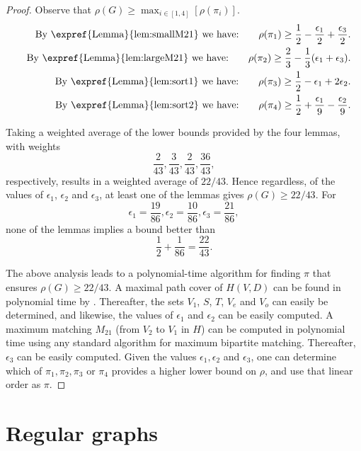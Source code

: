\begin{proof}
	Observe that $\rho(G) \ge \max_{i \in [1,4]}[\rho(\pi_i)]$.
	\begin{eqnarray}
		& & \mbox{By \expref{Lemma}{lem:smallM21} we have:} \quad \quad
		\rho(\pi_1) \ge \frac{1}{2} - \frac{\epsilon_1}{2}  + \frac{\epsilon_3}{2}.\\
		& & \mbox{By \expref{Lemma}{lem:largeM21} we have:} \quad \quad
		\rho(\pi_2) \ge \frac{2}{3} - \frac{1}{3}(\epsilon_1 + \epsilon_3).\\
		& & \mbox{By \expref{Lemma}{lem:sort1} we have:} \quad \quad
		\rho(\pi_3) \ge \frac{1}{2} - \epsilon_1 + 2\epsilon_2.\\
		& & \mbox{By \expref{Lemma}{lem:sort2} we have:} \quad \quad
		\rho(\pi_4) \ge \frac{1}{2} + \frac{\epsilon_1}{9}  - \frac{\epsilon_2}{9}.
	\end{eqnarray}
	
	
	Taking a weighted average of the lower bounds provided by the four lemmas, with weights $$\frac{2}{43}, \frac{3}{43}, \frac{2}{43}, \frac{36}{43},$$ respectively, results in a weighted average of $22/43$. Hence regardless, of the values of $\epsilon_1$, $\epsilon_2$ and $\epsilon_3$, at least one of the lemmas gives $\rho(G) \ge 22/43$. For $$\epsilon_1 = \frac{19}{86}, \epsilon_2 = \frac{10}{86}, \epsilon_3 = \frac{21}{86},$$ none of the lemmas implies a bound better than $$\frac{1}{2} + \frac{1}{86} = \frac{22}{43}.$$
	
	The above analysis leads to a polynomial-time algorithm for finding $\pi$ that ensures $\rho(G) \ge 22/43.$ A maximal path cover of $H(V,D)$ can be found in polynomial time by . Thereafter, the sets $V_1$, $S$, $T$, $V_e$ and $V_o$ can easily be determined, and likewise, the values of $\epsilon_1$ and $\epsilon_2$ can be easily computed. A maximum matching $M_{21}$ (from $V_2$ to $V_1$ in $H$) can be computed in polynomial time using any standard algorithm for maximum bipartite matching. Thereafter, $\epsilon_3$ can be easily computed. Given the values $\epsilon_1, \epsilon_2$ and $\epsilon_3$, one can determine which of $\pi_1, \pi_2, \pi_3$ or $\pi_4$ provides a higher lower bound on $\rho$, and use that linear order as $\pi$.
\end{proof}




\section{Regular graphs}
\label{sec:regular}

